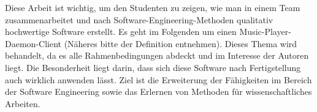 Diese Arbeit ist wichtig, um den Studenten zu zeigen, wie man in einem Team zusammenarbeitet und nach
Software-Engineering-Methoden qualitativ hochwertige Software erstellt. Es geht im Folgenden um einen
Music-Player-Daemon-Client (Näheres bitte der Definition entnehmen). Dieses Thema wird behandelt, da es
alle Rahmenbedingungen abdeckt und im Interesse der Autoren liegt. Die Besonderheit liegt darin, dass
sich diese Software nach Fertigstellung auch wirklich anwenden lässt. Ziel ist die Erweiterung der
Fähigkeiten im Bereich der Software Engineering sowie das Erlernen von Methoden für wissenschaftliches Arbeiten.



